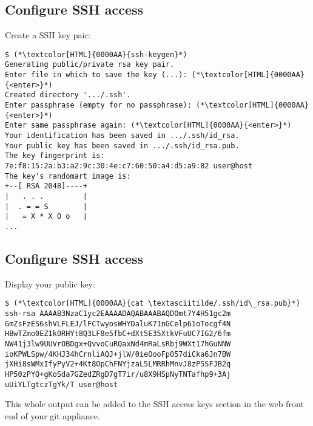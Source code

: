 \subsection{Configure SSH access}
\begin{frame}[fragile]
  \subslidetitle
  Create a SSH key pair:
  \begin{lstlisting}
$ (*\textcolor[HTML]{0000AA}{ssh-keygen}*)
Generating public/private rsa key pair.
Enter file in which to save the key (...): (*\textcolor[HTML]{0000AA}{<enter>}*)
Created directory '.../.ssh'.
Enter passphrase (empty for no passphrase): (*\textcolor[HTML]{0000AA}{<enter>}*)
Enter same passphrase again: (*\textcolor[HTML]{0000AA}{<enter>}*)
Your identification has been saved in .../.ssh/id_rsa.
Your public key has been saved in .../.ssh/id_rsa.pub.
The key fingerprint is:
7e:f8:15:2a:b3:a2:9c:30:4e:c7:60:50:a4:d5:a9:82 user@host
The key's randomart image is:
+--[ RSA 2048]----+
|   . . .         |
|  . = = S        |
|   = X * X O o   |
...
\end{lstlisting}
\end{frame}

\subsection{Configure SSH access}
\begin{frame}[fragile]
  \subslidetitle
  Display your public key:
  \begin{lstlisting}
$ (*\textcolor[HTML]{0000AA}{cat \textasciitilde/.ssh/id\_rsa.pub}*)
ssh-rsa AAAAB3NzaC1yc2EAAAADAQABAAABAQDOmt7Y4H51gc2m
GmZsFzES6shVLFLEJ/lFCTwyosWHYDaluK71nGCelp61oTocgf4N
HBwTZmo0EZ1k0RHYt8Q3LF8e5fbC+dXt5E35XtkVFuUC7IG2/6fm
NW41j3lw9UUVrOBDgx+QvvoCuRQaxNd4mRaLsRbj9WXt17hGuNNW
ioKPWLSpw/4KHJ34hCrnliAQJ+jlW/0ieOooFp057diCka6Jn7BW
jXHi8sWMxIfyPyV2+4Kt8OpChFNYjzaL5LMRRhMnvJ8zP5SFJB2q
HP50zPYQ+gKoSda7GZedZRgD7gT7ir/u8X9HSpNyTNTafhp9+3Aj
uUiYLTgtczTgYk/T user@host
\end{lstlisting}

  This whole output can be added to the SSH access keys
  section in the web front end of your git appliance.
\end{frame}


